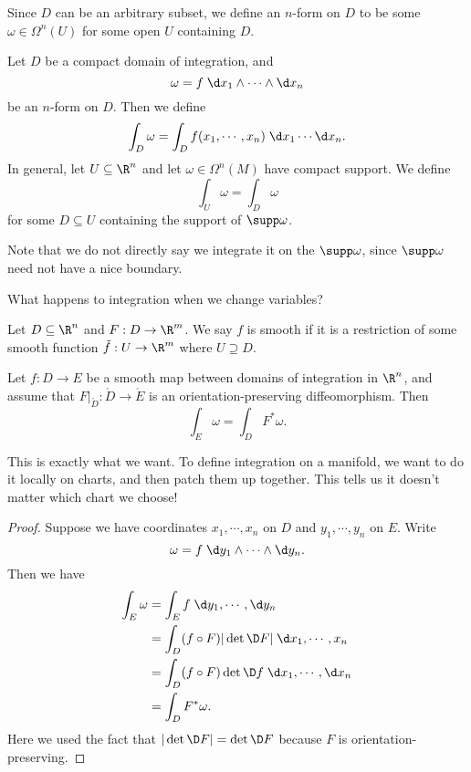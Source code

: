 \documentclass[a4paper]{article}
\begin{document}
Since $D$ can be an arbitrary subset, we define an $n$-form on $D$ to be some $\omega \in \Omega^n(U)$ for some open $U$ containing $D$.

\begin{defi}[Integration on $R^n$]
  Let $D$ be a compact domain of integration, and
  \[
    \omega = f\; \d x_1 \wedge \cdots \wedge \d x_n
  \]
  be an $n$-form on $D$. Then we define
  \[
    \int_D \omega = \int_D f(x_1, \cdots, x_n) \;\d x_1 \cdots \d x_n.
  \]
  In general, let $U \subseteq \R^n$ and let $\omega \in \Omega^n(M)$ have compact support. We define
  \[
    \int_U \omega = \int_D \omega
  \]
  for some $D\subseteq U$ containing the support of $\supp \omega$.
\end{defi}
Note that we do not directly say we integrate it on the $\supp \omega$, since $\supp \omega$ need not have a nice boundary.

What happens to integration when we change variables?

\begin{defi}
  Let $D \subseteq \R^n$ and $F: D \to \R^m$. We say $f$ is smooth if it is a restriction of some smooth function $\tilde{f}: U \to \R^m$ where $U \supseteq D$.
\end{defi}

\begin{lemma}
  Let $f: D \to E$ be a smooth map between domains of integration in $\R^n$, and assume that $F|_{\mathring{D}}: \mathring{D} \to \mathring{E}$ is an orientation-preserving diffeomorphism. Then
  \[
    \int_E \omega = \int_D F^* \omega.
  \]
\end{lemma}
This is exactly what we want. To define integration on a manifold, we want to do it locally on charts, and then patch them up together. This tells us it doesn't matter which chart we choose!

\begin{proof}
  Suppose we have coordinates $x_1, \cdots, x_n$ on $D$ and $y_1, \cdots, y_n$ on $E$. Write
  \[
    \omega = f\;\d y_1 \wedge \cdots \wedge \d y_n.
  \]
  Then we have
  \begin{align*}
    \int_E \omega &= \int_E f\;\d y_1, \cdots, \d y_n\\
    &= \int_D (f \circ F)|\det \D F|\;\d x_1, \cdots, x_n\\
    &= \int_D (f \circ F) \det \D f \; \d x_1, \cdots, \d x_n\\
    &= \int_D F^* \omega.
  \end{align*}
  Here we used the fact that $|\det \D F| = \det \D F$ because $F$ is orientation-preserving.
\end{proof}
\end{document}

